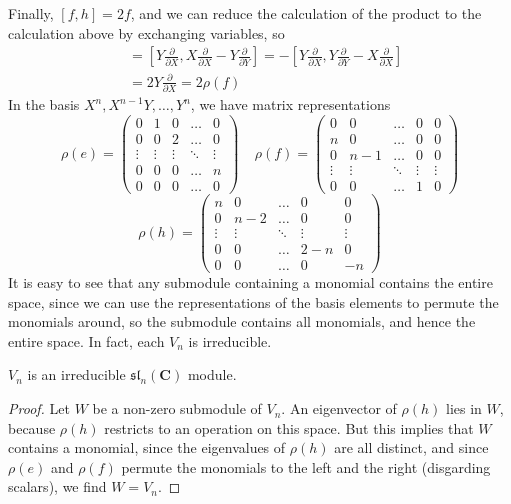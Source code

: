 %
Finally, $[f, h] = 2f$, and we can reduce the calculation of the product to the calculation above by exchanging variables, so
%
\begin{align*}
    [\rho(f), \rho(h)] &= \left[ Y \frac{\partial}{\partial X}, X \frac{\partial}{\partial X} - Y \frac{\partial}{\partial Y} \right] = - \left[ Y \frac{\partial}{\partial X}, Y \frac{\partial}{\partial Y} - X \frac{\partial}{\partial X} \right]\\
    &= 2 Y \frac{\partial}{\partial X} = 2 \rho(f)
\end{align*}
%
In the basis $X^n,X^{n-1}Y, \dots, Y^n$, we have matrix representations
%
\[ \rho(e) = \begin{pmatrix} 0 & 1 & 0 & \dots & 0 \\ 0 & 0 & 2 & \dots & 0 \\ \vdots & \vdots & \vdots & \ddots & \vdots \\ 0 & 0 & 0 & \dots & n \\ 0 & 0 & 0 & \dots & 0 \end{pmatrix}\ \ \ \ \ \rho(f) = \begin{pmatrix} 0 & 0 & \dots & 0 & 0 \\ n & 0 & \dots & 0 & 0 \\ 0 & n-1 & \dots & 0 & 0 \\ \vdots & \vdots & \ddots & \vdots & \vdots \\ 0 & 0 & \dots & 1 & 0 \end{pmatrix} \]
\[ \rho(h) = \begin{pmatrix} n & 0 & \dots & 0 & 0 \\ 0 & n-2 & \dots & 0 & 0 \\ \vdots & \vdots & \ddots & \vdots & \vdots \\ 0 & 0 & \dots & 2 - n & 0 \\ 0 & 0 & \dots & 0 & -n \end{pmatrix} \]
%
It is easy to see that any submodule containing a monomial contains the entire space, since we can use the representations of the basis elements to permute the monomials around, so the submodule contains all monomials, and hence the entire space. In fact, each $V_n$ is irreducible.

\begin{theorem}
    $V_n$ is an irreducible $\mathfrak{sl}_n(\mathbf{C})$ module.
\end{theorem}
\begin{proof}
    Let $W$ be a non-zero submodule of $V_n$. An eigenvector of $\rho(h)$ lies in $W$, because $\rho(h)$ restricts to an operation on this space. But this implies that $W$ contains a monomial, since the eigenvalues of $\rho(h)$ are all distinct, and since $\rho(e)$ and $\rho(f)$ permute the monomials to the left and the right (disgarding scalars), we find $W = V_n$.
\end{proof}

